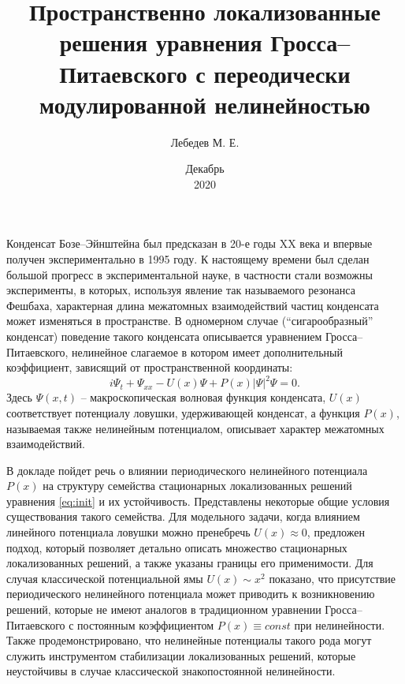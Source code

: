 \documentclass [a4paper] {article}
\title{Пространственно локализованные решения уравнения Гросса--Питаевского с переодически модулированной нелинейностью}
\author{Лебедев М. Е.}
\affil{Институт математики с вычислительным центром \\ УФИЦ РАН}
\date{Декабрь \\ 2020}
\begin{document}
\maketitle
\thispagestyle{empty} %

Конденсат Бозе--Эйнштейна был предсказан в 20-е годы \textsc{XX} века и впервые получен экспериментально в 1995 году.
К настоящему времени был сделан большой прогресс в экспериментальной науке, в частности стали возможны эксперименты, в которых, используя явление так называемого резонанса Фешбаха, характерная длина межатомных взаимодействий частиц конденсата может изменяться в пространстве.
В одномерном случае (``сигарообразный'' конденсат) поведение такого конденсата описывается уравнением Гросса--Питаевского, нелинейное слагаемое в котором имеет дополнительный коэффициент, зависящий от пространственной координаты:
\begin{equation}
i \Psi_t + \Psi_{xx} - U(x) \Psi + P(x) |\Psi|^2 \Psi = 0.
\label{eq:init}
\end{equation}
Здесь $\Psi(x, t)$ -- макроскопическая волновая функция конденсата, $U(x)$ соответствует потенциалу ловушки, удерживающей конденсат, а функция $P(x)$, называемая также нелинейным потенциалом, описывает характер межатомных взаимодействий.

В докладе пойдет речь о влиянии периодического нелинейного потенциала $P(x)$ на структуру семейства стационарных локализованных решений уравнения \eqref{eq:init} и их устойчивость.
Представлены некоторые общие условия существования такого семейства.
Для модельного задачи, когда влиянием линейного потенциала ловушки можно пренебречь $U(x) \approx 0$, предложен подход, который позволяет детально описать множество стационарных локализованных решений, а также указаны границы его применимости.
Для случая классической потенциальной ямы $U(x) \sim x^2$ показано, что присутствие периодического нелинейного потенциала может приводить к возникновению решений, которые не имеют аналогов в традиционном уравнении Гросса--Питаевского с постоянным коэффициентом $P(x) \equiv const$ при нелинейности.
Также продемонстрировано, что нелинейные потенциалы такого рода могут служить инструментом стабилизации локализованных решений, которые неустойчивы в случае классической знакопостоянной нелинейности.
\end{document}
